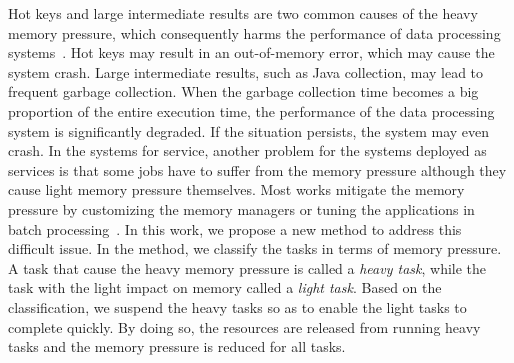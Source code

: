 
Hot keys and large intermediate results are two common causes of the heavy memory pressure, which consequently harms the performance of data processing systems~\cite{fang2015interruptible}. Hot keys may result in an out-of-memory error, which may cause the system crash. Large intermediate results, such as Java collection, may lead to frequent garbage collection. When the garbage collection time becomes a big proportion of the entire execution time, the performance of the data processing system is significantly degraded. If the situation persists, the system may even crash. In the systems for service, another problem for the systems deployed as services is that some jobs have to suffer from the memory pressure although they cause light memory pressure themselves. Most works mitigate the memory pressure by customizing the memory managers or tuning the applications in batch processing~\cite{www:spark-tuning, nguyen2015facade, fang2015interruptible, lulu:deca, nguyen:yak}. In this work, we propose a new method to address this difficult issue. In the method, we classify the tasks in terms of memory pressure. A task that cause the heavy memory pressure is called a \textit{heavy task}, while the task with the light impact on memory called a \textit{light task}. Based on the classification, we suspend the heavy tasks so as to enable the light tasks to complete quickly. By doing so, the resources are released from running heavy tasks and the memory pressure is reduced for all tasks.

